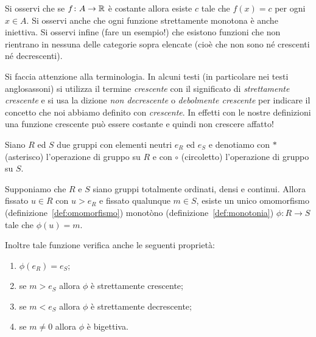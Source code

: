 Si osservi che se $f\colon A \to {\mathbb R}$ è costante allora esiste $c$ tale che
$f(x)=c$ per ogni $x\in A$. 
Si osservi anche che ogni funzione strettamente monotona è anche iniettiva. Si osservi infine (fare un esempio!) che esistono funzioni che non rientrano in nessuna delle categorie sopra elencate (cioè che non sono né crescenti né decrescenti).

Si faccia attenzione alla terminologia.
In alcuni testi (in particolare nei testi anglosassoni) si utilizza il termine
\emph{crescente} con il significato di \emph{strettamente crescente} 
e si usa la dizione \emph{non decrescente} o \emph{debolmente crescente} 
per indicare il concetto che noi abbiamo definito con \emph{crescente}. 
In effetti con le nostre definizioni una funzione crescente può essere costante
e quindi non crescere affatto!

\begin{theorem}
\label{th:isomorfismo}%
Siano $R$ ed $S$ due gruppi
con elementi neutri $e_R$ ed $e_S$ e denotiamo con $*$ (asterisco) l'operazione di gruppo su $R$ 
e con $\circ$ (circoletto) l'operazione di gruppo su $S$.

Supponiamo che $R$ e $S$ siano gruppi totalmente ordinati, densi e continui.
Allora fissato $u\in R$ con $u > e_R$ e fissato qualunque $m \in S$, 
esiste un unico omomorfismo (definizione~\ref{def:omomorfismo}) monotòno (definizione~\ref{def:monotonia})
$\phi\colon R \to S$ tale che $\phi(u)=m$.

Inoltre tale funzione verifica anche le seguenti proprietà:
\begin{enumerate}
  \item $\phi(e_R) = e_S$;
  \item se $m>e_S$ allora $\phi$ è strettamente crescente;
  \item se $m<e_S$ allora $\phi$ è strettamente decrescente;
  \item se $m\neq 0$ allora $\phi$ è bigettiva.
\end{enumerate}
\end{theorem}

